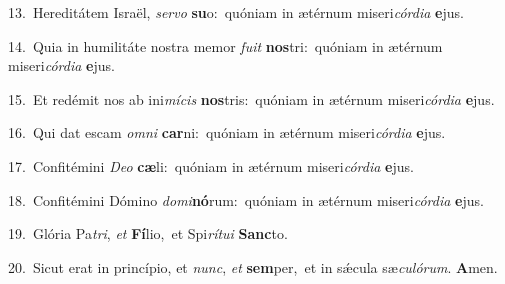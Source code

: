{\numbfont\textcolor{\numbcolor}{13.}}~Hereditátem Israël, \textit{ser}\-\textit{vo} \textbf{su}\-o:~\star quóniam in ætérnum miseri\-\textit{cór}\-\textit{di}\textit{a} \textbf{e}\-jus.\par
{\numbfont\textcolor{\numbcolor}{14.}}~Quia in humilitáte nostra memor \textit{fu}\-\textit{it} \textbf{nos}\-tri:~\star quóniam in ætérnum miseri\-\textit{cór}\-\textit{di}\textit{a} \textbf{e}\-jus.\par
{\numbfont\textcolor{\numbcolor}{15.}}~Et redémit nos ab ini\-\textit{mí}\-\textit{cis} \textbf{nos}\-tris:~\star quóniam in ætérnum miseri\-\textit{cór}\-\textit{di}\textit{a} \textbf{e}\-jus.\par
{\numbfont\textcolor{\numbcolor}{16.}}~Qui dat escam \textit{om}\-\textit{ni} \textbf{car}\-ni:~\star quóniam in ætérnum miseri\-\textit{cór}\-\textit{di}\textit{a} \textbf{e}\-jus.\par
{\numbfont\textcolor{\numbcolor}{17.}}~Confitémini \textit{De}\-\textit{o} \textbf{cæ}\-li:~\star quóniam in ætérnum miseri\-\textit{cór}\-\textit{di}\textit{a} \textbf{e}\-jus.\par
{\numbfont\textcolor{\numbcolor}{18.}}~Confitémini Dómino \textit{do}\-\textit{mi}\textbf{nó}rum:~\star quóniam in ætérnum miseri\-\textit{cór}\-\textit{di}\textit{a} \textbf{e}\-jus.\par
{\numbfont\textcolor{\numbcolor}{19.}}~Glória Pa\-\textit{tri}\-, \textit{et} \textbf{Fí}\-lio,~\star et Spi\-\textit{rí}\-\textit{tu}\textit{i} \textbf{Sanc}\-to.\par
{\numbfont\textcolor{\numbcolor}{20.}}~Sicut erat in princípio, et \textit{nunc}\-, \textit{et} \textbf{sem}\-per,~\star et in sǽcula sæ\-\textit{cu}\-\textit{ló}\textit{rum}. \textbf{A}\-men.\par
